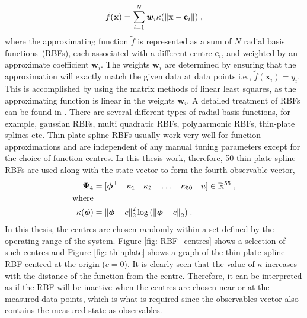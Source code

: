 \begin{equation}
    \tilde{f}(\mathbf{x}) = \sum_{i=1}^N \boldsymbol{w}_i \kappa(\left\lVert\mathbf{x}-\mathbf{c}_i\right\rVert) \;,
\end{equation}
where the approximating function $\tilde{f}$ is represented as a sum of $N$ radial basis functions~(RBFs), each associated with a different centre $\mathbf{c}_i$, and weighted by an approximate coefficient $\boldsymbol{w}_i$. The weights $\boldsymbol{w}_i$ are determined by ensuring that the approximation will exactly match the given data at data points i.e., $\tilde{f}(\mathbf{x}_i) = y_i $. This is accomplished by using the matrix methods of linear least squares, as the approximating function is linear in the weights $\boldsymbol{w}_i$. A detailed treatment of RBFs can be found in \cite{RBF}. There are several different types of radial basis functions, for example, gaussian RBFs, multi quadratic RBFs, polyharmonic RBFs, thin-plate splines etc. Thin plate spline RBFs usually work very well for function approximations \cite{Korda_edmd_conv} and are independent of any manual tuning parameters except for the choice of function centres. In this thesis work, therefore, 50 thin-plate spline RBFs are used along with the state vector to form the fourth observable vector,
\begin{align}
    \mathbf{\Psi}_4 &= [\boldsymbol{\phi}^\top \quad \kappa_1 \quad \kappa_2 \quad \dots \quad \kappa_{50} \quad u] \in \mathbb{R}^{55}\;,\\
    \textup{where} \notag \\
    \kappa(\boldsymbol{\phi}) &= \left\lVert\boldsymbol{\phi} - c\right\rVert_2^2\log{(\left\lVert\boldsymbol{\phi} - c\right\rVert_2)} \;.
\end{align}
In this thesis, the centres are chosen randomly within a set defined by the operating range of the system. Figure \ref{fig: RBF_centres} shows a selection of such centres and Figure \ref{fig: thinplate} shows a graph of the thin plate  spline RBF centred at the origin ($c = 0$). It is clearly seen that the value of $\kappa$ increases with the distance of the function from the centre. Therefore, it can be interpreted as if the RBF will be inactive when the centres are chosen near or at the measured data points, which is what is required since the observables vector also contains the measured state as observables. 
% 
